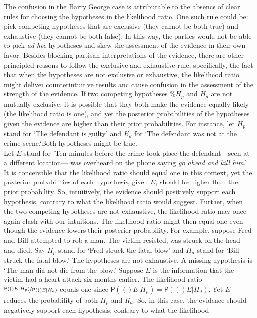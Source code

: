 \documentclass[10pt,dvipsnames,enabledeprecatedfontcommands]{scrartcl}
\newcommand{\pr}[1]{\mathsf{P}(#1)}
\begin{document}
The confusion in the Barry George case is attributable to the absence of
clear rules for choosing the hypotheses in the likelihood ratio. One
such rule could be: pick competing hypotheses that are exclusive (they
cannot be both true) and exhaustive (they cannot be both false). In this
way, the parties would not be able to pick \textit{ad hoc} hypotheses
and skew the assessment of the evidence in their own favor. Besides
blocking partisan interpretations of the evidence, there are other
principled reasons to follow the exclusive-and-exhaustive rule,
specifically, the fact that when the hypotheses are not exclusive or
exhaustive, the likelihood ratio might deliver counterintuitive results
and cause confusion in the assessment of the strength of the evidence.
If two competing hypotheses \%\(H_p\) and \(H_d\) are not mutually
exclusive, it is possible that they both make the evidence equally
likely (the likelihood ratio is one), and yet the posterior
probabilities of the hypotheses given the evidence are higher than their
prior probabilities. For instance, let \(H_p\) stand for `The defendant
is guilty' and \(H_d\) for `The defendant was not at the crime
scene.`Both hypotheses might be true.\\
Let \(E\) stand for 'Ten minutes before the crime took place the
defendant---seen at a different location--- was overheard on the phone
saying \emph{go ahead and kill him}.' It is conceivable that the
likelihood ratio should equal one in this context, yet the posterior
probabilities of each hypothesis, given \(E\), should be higher than the
prior probability. So, intuitively, the evidence should positively
support each hypothesis, contrary to what the likelihood ratio would
suggest. Further, when the two competing hypotheses are not exhaustive,
the likelihood ratio may once again clash with our intuitions. The
likelihood ratio might then equal one even though the evidence lowers
their posterior probability. For example, suppose Fred and Bill
attempted to rob a man. The victim resisted, was struck on the head and
died. Say \(H_p\) stand for `Fred struck the fatal blow' and \(H_d\)
stand for `Bill struck the fatal blow.' The hypotheses are not
exhaustive. A missing hypothesis is `The man did not die from the blow.'
Suppose \(E\) is the information that the victim had a heart attack six
months earlier. The likelihood ratio
\(\nicefrac{\pr(E \vert H_p)}{\pr(E \vert H_d)}\) equals one since
\(\pr(E\vert H_p)=\pr(E\vert H_d)\). Yet \(E\) reduces the probability
of both \(H_p\) and \(H_d\). So, in this case, the evidence should
negatively support each hypothesis, contrary to what the likelihood
\end{document}
